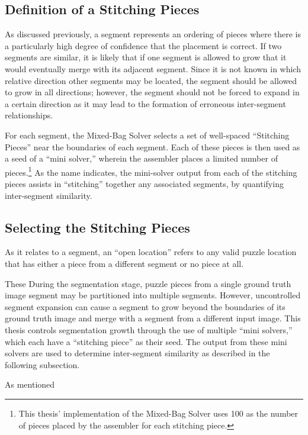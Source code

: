 \subsection{Definition of a Stitching Pieces}

As discussed previously, a segment represents an ordering of pieces where there is a particularly high degree of confidence that the placement is correct. If two segments are similar, it is likely that if one segment is allowed to grow that it would eventually merge with its adjacent segment. Since it is not known in which relative direction other segments may be located, the segment should be allowed to grow in all directions; however, the segment should not be forced to expand in a certain direction as it may lead to the formation of erroneous inter-segment relationships.

For each segment, the Mixed-Bag Solver selects a set of well-spaced ``Stitching Pieces'' near the boundaries of each segment.  Each of these pieces is then used as a seed of a ``mini solver,'' wherein the assembler places a limited number of pieces.\footnote{This thesis' implementation of the Mixed-Bag Solver uses 100 as the number of pieces placed by the assembler for each stitching piece.}  As the name indicates, the mini-solver output from each of the stitching pieces assists in ``stitching'' together any associated segments, by quantifying inter-segment similarity.  

\subsection{Selecting the Stitching Pieces} 

As it relates to a segment, an ``open location'' refers to any valid puzzle location that has either a piece from a different segment or no piece at all.  

These During the segmentation stage, puzzle pieces from a single ground truth image segment may be partitioned into multiple segments.   However, uncontrolled segment expansion can cause a segment to grow beyond the boundaries of its ground truth image and merge with a segment from a different input image.  This thesis controls segmentation growth through the use of multiple ``mini solvers,'' which each have a ``stitching piece'' as their seed.  The output from these mini solvers are used to determine inter-segment similarity as described in the following subsection.



As mentioned 



